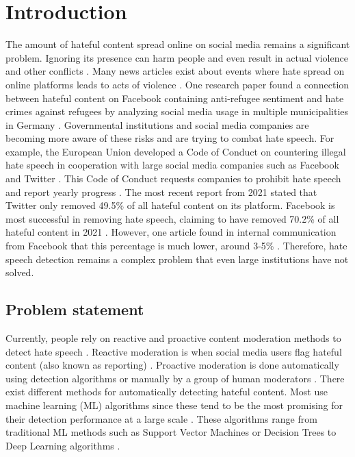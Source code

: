 \chapter{Introduction}
\label{ch:introduction}
\newcommand{\customtextbox}[1]{
	\setlength{\fboxsep}{0.5em}
	\fbox{
		\begin{minipage}{\linewidth-1.7em}
			\vspace*{0.25em}
			#1
		\end{minipage}
	}
}

The amount of hateful content spread online on social media remains a significant problem.
%
Ignoring its presence can harm people and even result in actual violence and other conflicts \citep{ecri-hate-speech-and-violence, balayn2021automatic}.
%
Many news articles exist about events where hate spread on online platforms leads to acts of violence \citep{columbia-facebook-linked-to-violence, mujib-mashal-india, paul-mozur-2018, muller2021fanning}.
%
One research paper found a connection between hateful content on Facebook containing anti-refugee sentiment and hate crimes against refugees by analyzing social media usage in multiple municipalities in Germany \citep{muller2021fanning}.
%
Governmental institutions and social media companies are becoming more aware of these risks and are trying to combat hate speech.
%
For example, the European Union developed a Code of Conduct on countering illegal hate speech in cooperation with large social media companies such as Facebook and Twitter \citep{eu-code-of-conduct}.
%
This Code of Conduct requests companies to prohibit hate speech and report yearly progress \citep{eu-code-of-conduct}.
%
The most recent report from 2021 stated that Twitter only removed 49.5\% of all hateful content on its platform.
%
Facebook is most successful in removing hate speech, claiming to have removed 70.2\% of all hateful content in 2021 \citep{eu-code-of-conduct}.
%
However, one article found in internal communication from Facebook that this percentage is much lower, around 3-5\% \citep{noah2021giansiracusa}.
%
Therefore, hate speech detection remains a complex problem that even large institutions have not solved.

\section{Problem statement}
Currently, people rely on reactive and proactive content moderation methods to detect hate speech \citep{klonick2017new}.
%
Reactive moderation is when social media users flag hateful content (also known as reporting) \citep{klonick2017new}.
%
Proactive moderation is done automatically using detection algorithms or manually by a group of human moderators \citep{klonick2017new}.
%
There exist different methods for automatically detecting hateful content.
%
Most use machine learning (ML) algorithms since these tend to be the most promising for their detection performance at a large scale \citep{balayn2021automatic, fortuna2018survey}.
%
These algorithms range from traditional ML methods such as Support Vector Machines or Decision Trees to Deep Learning algorithms \citep{fortuna2018survey}.
%

